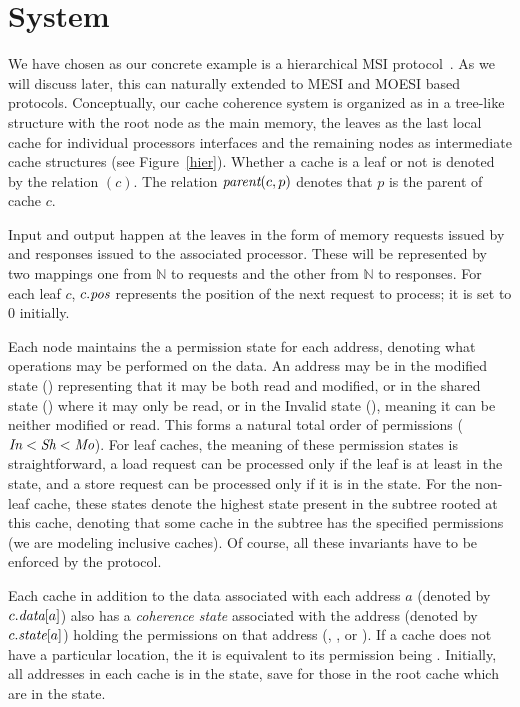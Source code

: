 \section{System}
\label{sec:System}

We have chosen as our concrete example is a hierarchical
MSI protocol~\cite{MSI}. As we will
discuss later, this can naturally extended to MESI and MOESI based protocols.
Conceptually, our cache coherence system is
organized as in a tree-like structure with the root node as the main
memory, the leaves as the last local cache for individual processors
interfaces and the remaining nodes as intermediate cache structures
(see Figure~\ref{hier}). Whether a cache is a leaf or not is denoted
by the relation \leaf$(c)$.  The relation $\textit{parent}(c, p)$
denotes that $p$ is the parent of cache $c$.

Input and output happen at the leaves in the form of memory requests
issued by and responses issued to the associated processor. These will be
represented by two mappings one from $\mathbb{N}$ to requests and the other
from $\mathbb{N}$ to responses. For each leaf $c$, $c.\textit{pos}$ represents the
position of the next request to process; it is set to $0$ initially.

Each node maintains the a permission state for
each address, denoting what operations may be performed on the
data. An address may be in the modified state (\Mo) representing that
it may be both read and modified, or in the shared state (\Sh) where
it may only be read, or in the Invalid state (\In), meaning it can be
neither modified or read. This forms a natural total order of
permissions ($\textit{In} < \textit{Sh} < \textit{Mo}$). For leaf caches, the meaning of these
permission states is straightforward, a load request can be processed only if the
leaf is at least in the \Sh{} state, and a store request can be processed only
if it is in the \Mo{} state. For the non-leaf cache, these states denote the
highest state present in the subtree rooted at this cache, denoting that some
cache in the subtree has the specified permissions (we are modeling inclusive
caches). Of course, all these invariants have to be enforced by the protocol.

Each cache in addition to the data associated with each address $a$
(denoted by $c.\textit{data}[a]$) also has a \emph{coherence state}
associated with the address (denoted by $c.\textit{state}[a]$) holding the
permissions on that address (\Mo, \Sh, or \In). If a cache does not have a
particular location, the it is equivalent to its permission being \In.
Initially, all addresses in each cache is in the \In state, save for those in
the root cache which are in the \Mo state.


